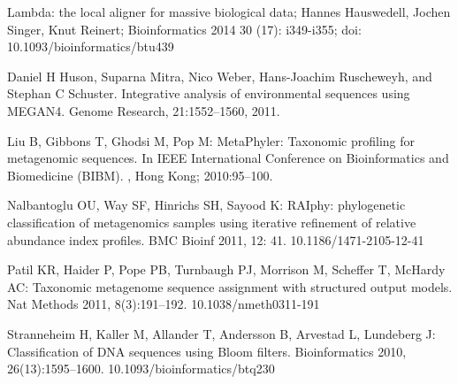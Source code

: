 \documentclass[10pt, a4paper]{article}[08.12.2015]
\begin{document}
\begin{thebibliography}{14}
      Lambda: the local aligner for massive biological data; Hannes 				  Hauswedell, Jochen Singer, Knut Reinert; Bioinformatics 2014 30 (17): 		  i349-i355; doi: 10.1093/bioinformatics/btu439
      
       Daniel H Huson, Suparna Mitra, Nico Weber, Hans-Joachim Ruscheweyh, and 	   Stephan C Schuster. Integrative analysis of environmental sequences 			   using MEGAN4. Genome Research, 21:1552–1560, 2011.
      
      
	  Liu B, Gibbons T, Ghodsi M, Pop M: MetaPhyler: Taxonomic profiling for 		  metagenomic sequences. In IEEE International Conference on 					  Bioinformatics and Biomedicine (BIBM). , Hong Kong; 2010:95–100.
	  
	  Nalbantoglu OU, Way SF, Hinrichs SH, Sayood K: RAIphy: phylogenetic 			  classification of metagenomics samples using iterative refinement of 			  relative abundance index profiles. BMC Bioinf 2011, 12: 41. 					  10.1186/1471-2105-12-41
	  
	  Patil KR, Haider P, Pope PB, Turnbaugh PJ, Morrison M, Scheffer T, 			  McHardy AC: Taxonomic metagenome sequence assignment with structured 			  output models. Nat Methods 2011, 8(3):191–192. 10.1038/nmeth0311-191
		 
	  
	  Stranneheim H, Kaller M, Allander T, Andersson B, Arvestad L, Lundeberg 		  J: Classification of DNA sequences using Bloom filters. Bioinformatics 		  2010, 26(13):1595–1600. 10.1093/bioinformatics/btq230
	  
	  	 
	  

    \end{thebibliography}
\end{document}
